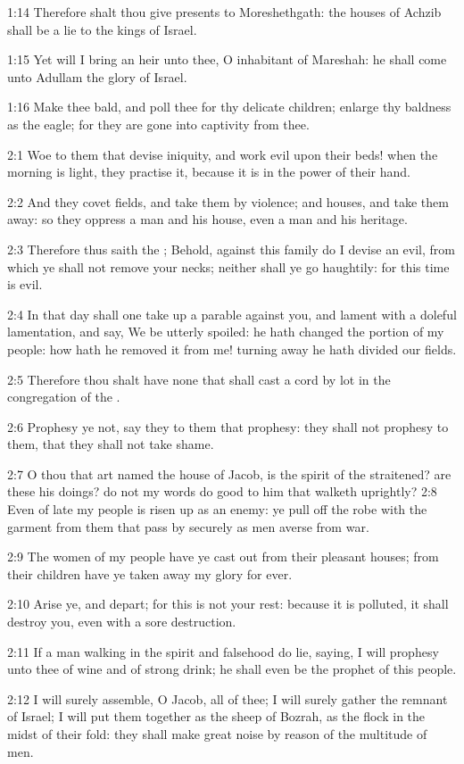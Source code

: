 1:14 Therefore shalt thou give presents to Moreshethgath: the houses
of Achzib shall be a lie to the kings of Israel.

1:15 Yet will I bring an heir unto thee, O inhabitant of Mareshah: he
shall come unto Adullam the glory of Israel.

1:16 Make thee bald, and poll thee for thy delicate children; enlarge
thy baldness as the eagle; for they are gone into captivity from thee.

2:1 Woe to them that devise iniquity, and work evil upon their beds!
when the morning is light, they practise it, because it is in the
power of their hand.

2:2 And they covet fields, and take them by violence; and houses, and
take them away: so they oppress a man and his house, even a man and
his heritage.

2:3 Therefore thus saith the \LORD; Behold, against this family do I
devise an evil, from which ye shall not remove your necks; neither
shall ye go haughtily: for this time is evil.

2:4 In that day shall one take up a parable against you, and lament
with a doleful lamentation, and say, We be utterly spoiled: he hath
changed the portion of my people: how hath he removed it from me!
turning away he hath divided our fields.

2:5 Therefore thou shalt have none that shall cast a cord by lot in
the congregation of the \LORD.

2:6 Prophesy ye not, say they to them that prophesy: they shall not
prophesy to them, that they shall not take shame.

2:7 O thou that art named the house of Jacob, is the spirit of the
\LORD straitened? are these his doings? do not my words do good to him
that walketh uprightly?  2:8 Even of late my people is risen up as an
enemy: ye pull off the robe with the garment from them that pass by
securely as men averse from war.

2:9 The women of my people have ye cast out from their pleasant
houses; from their children have ye taken away my glory for ever.

2:10 Arise ye, and depart; for this is not your rest: because it is
polluted, it shall destroy you, even with a sore destruction.

2:11 If a man walking in the spirit and falsehood do lie, saying, I
will prophesy unto thee of wine and of strong drink; he shall even be
the prophet of this people.

2:12 I will surely assemble, O Jacob, all of thee; I will surely
gather the remnant of Israel; I will put them together as the sheep of
Bozrah, as the flock in the midst of their fold: they shall make great
noise by reason of the multitude of men.

